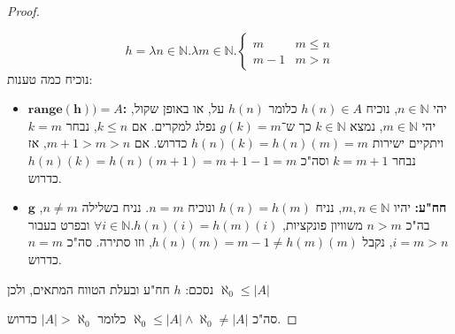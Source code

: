 \documentclass[]{article}
\newcommand\N     {\mathbb{N}}
\newcommand\az    {\aleph_0}
\begin{document}
\begin{proof}
\begin{itemize}
			\[ h = \lambda n \in \N. \lambda m \in \N. \begin{cases}
				m & m \le n \\
				m - 1 & m > n
			\end{cases} \]
			נוכיח כמה טענות: 
			\begin{itemize}
				\item $ \bm{\mathbf{range}(h))} = A $\textbf{: }יהי $ n \in\N $, נוכיח $ h(n) \in A $ כלומר $ h(n) $ על, או באופן שקול, יהי $ m \in \N $, נמצא $ k \in \N $ כך ש־$ g(k) = m $ נפלג למקרים. אם $ k \le n $, נבחר $ k = m $ ויתקיים ישירות $ h(n)(k) = h(n)(m) = m $ כדרוש. אם $ m + 1 > m > n $, אז נבחר $ k = m + 1 $ וסה"כ $ h(n)(k) = h(n)(m + 1) = m + 1 - 1 = m $ כדרוש. 
				\item $ \bm{g} $\textbf{ חח"ע: }יהיו $ m, n \in \N $, נניח $ h(n) = h(m) $ ונוכיח $ n = m $. נניח בשלילה $ n \neq m $,  בה"כ $ n > m $ משוויון פונקציות, $ \forall i \in \N. h(n)(i) = h(m)(i) $ ובפרט בעבור $ i = m > n $, נקבל $ h(n)(m) = m - 1 \neq h(m)(m) $, וזו סתירה. סה"כ $ n =m $ כדרוש. 
			\end{itemize}
			נסכם: $ h $ חח"ע ובעלת הטווח המתאים, ולכן $ \az \le |A| $
		\end{itemize}
		סה"כ $ \az \le |A| \land \az \neq |A| $ כלומר $ |A| > \az $ כדרוש. 
	\end{proof}
\end{document}
